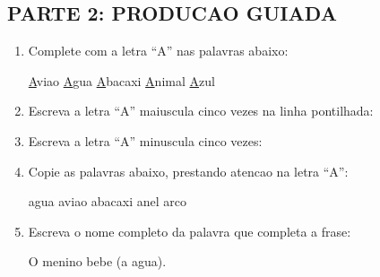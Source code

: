 \begin{exercicio}
\subsection*{PARTE 2: PRODUCAO GUIADA}

\begin{enumerate}[resume]
  \item Complete com a letra ``A'' nas palavras abaixo:
  \begin{center}
  \underline{A}viao \quad \underline{A}gua \quad \underline{A}bacaxi \quad \underline{A}nimal \quad \underline{A}zul
  \end{center}

  \item Escreva a letra ``A'' maiuscula cinco vezes na linha pontilhada:
  \begin{center}
  \underline{\hspace{1.5cm}} \quad \underline{\hspace{1.5cm}} \quad \underline{\hspace{1.5cm}} \quad \underline{\hspace{1.5cm}} \quad \underline{\hspace{1.5cm}}
  \end{center}

  \item Escreva a letra ``A'' minuscula cinco vezes:
  \begin{center}
  \underline{\hspace{1.5cm}} \quad \underline{\hspace{1.5cm}} \quad \underline{\hspace{1.5cm}} \quad \underline{\hspace{1.5cm}} \quad \underline{\hspace{1.5cm}}
  \end{center}

  \item Copie as palavras abaixo, prestando atencao na letra ``A'':
  \begin{center}
  agua \quad aviao \quad abacaxi \quad anel \quad arco
  \end{center}

  \item Escreva o nome completo da palavra que completa a frase:
  \begin{center}
  O menino bebe \underline{\hspace{3cm}} (a agua).
  \end{center}
\end{enumerate}


\end{exercicio}
